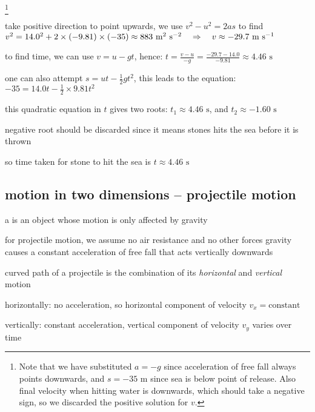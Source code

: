 \footnote{Note that we have substituted  $a=-g$ since acceleration of free fall always points downwards, and $s=-35\text{ m}$ since sea is below point of release. Also final velocity when hitting water is downwards, which should take a negative sign, so we discarded the positive solution for $v$.}
\begin{soln}
 take positive direction to point upwards, we use $v^2 - u^2 = 2as$ to find $v^2 = 14.0^2 + 2\times(-9.81)\times(-35) \approx 883 \text{ m}^2 \text{ s}^{-2} \quad \Rightarrow \quad v\approx -29.7\text{ m s$^{-1}$}$
 

to find time, we can use $v = u-gt$, hence: $ t = \frac{v-u}{-g} = \frac{-29.7-14.0}{-9.81} \approx 4.46 \text{ s} $

one can also attempt $s = ut - \frac{1}{2}gt^2$, this leads to the equation: $-35 = 14.0t - \frac{1}{2}\times9.81t^2$

this quadratic equation in $t$ gives two roots: $t_1 \approx 4.46 \text{ s}$, and $t_2 \approx -1.60 \text{ s}$

negative root should be discarded since it means stones hits the sea before it is thrown

so time taken for stone to hit the sea is $t \approx 4.46\text{ s}$ \end{soln}





\subsection{motion in two dimensions -- projectile motion}\label{ch:projectile}

a  is an object whose motion is only affected by gravity

for projectile motion, we assume no air resistance and no other forces
gravity causes a constant acceleration of free fall that acts vertically downwards

\cmt curved path of a projectile is the combination of its \emph{horizontal} and \emph{vertical} motion

\titem horizontally: no acceleration, so horizontal component of velocity $v_x = \text{constant}$

\titem vertically: constant acceleration, vertical component of velocity $v_y$ varies over time

